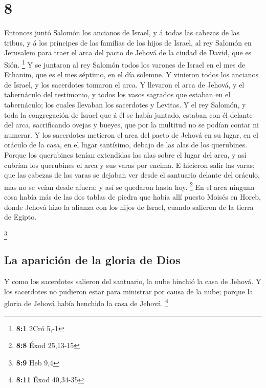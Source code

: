 \hypertarget{section-7}{%
\section{8}\label{section-7}}

 Entonces juntó Salomón los ancianos de Israel, y á todas
las cabezas de las tribus, y á los príncipes de las familias de los
hijos de Israel, al rey Salomón en Jerusalem para traer el arca del
pacto de Jehová de la ciudad de David, que es Sión. \footnote{\textbf{8:1}
  2Cró 5,-1}  Y se juntaron al rey Salomón todos los varones
de Israel en el mes de Ethanim, que es el mes séptimo, en el día
solemne.  Y vinieron todos los ancianos de Israel, y los
sacerdotes tomaron el arca.  Y llevaron el arca de Jehová, y
el tabernáculo del testimonio, y todos los vasos sagrados que estaban en
el tabernáculo; los cuales llevaban los sacerdotes y Levitas.
 Y el rey Salomón, y toda la congregación de Israel que á él
se había juntado, estaban con él delante del arca, sacrificando ovejas y
bueyes, que por la multitud no se podían contar ni numerar. 
Y los sacerdotes metieron el arca del pacto de Jehová en su lugar, en el
oráculo de la casa, en el lugar santísimo, debajo de las alas de los
querubines.  Porque los querubines tenían extendidas las
alas sobre el lugar del arca, y así cubrían los querubines el arca y sus
varas por encima.  E hicieron salir las varas; que las
cabezas de las varas se dejaban ver desde el santuario delante del
oráculo, mas no se veían desde afuera: y así se quedaron hasta hoy.
\footnote{\textbf{8:8} Éxod 25,13-15}  En el arca ninguna
cosa había más de las dos tablas de piedra que había allí puesto Moisés
en Horeb, donde Jehová hizo la alianza con los hijos de Israel, cuando
salieron de la tierra de Egipto.

\footnote{\textbf{8:9} Heb 9,4}

\hypertarget{la-apariciuxf3n-de-la-gloria-de-dios}{%
\subsection{La aparición de la gloria de
Dios}\label{la-apariciuxf3n-de-la-gloria-de-dios}}

 Y como los sacerdotes salieron del santuario, la nube
hinchió la casa de Jehová.  Y los sacerdotes no pudieron
estar para ministrar por causa de la nube; porque la gloria de Jehová
había henchido la casa de Jehová. \footnote{\textbf{8:11} Éxod 40,34-35}

